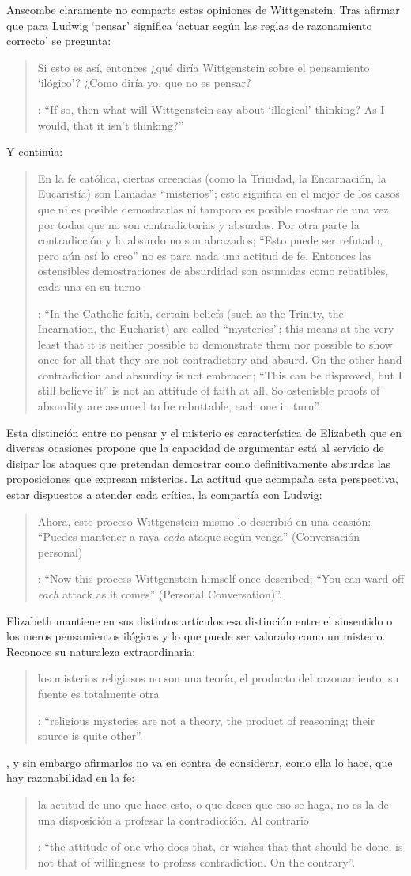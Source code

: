 Anscombe claramente no comparte estas opiniones de Wittgenstein. Tras afirmar que para Ludwig `pensar' significa \enquote*{actuar según las reglas de razonamiento correcto} se pregunta: \blockquote[{\Cite[122]{anscombe1981parmenides:qli}}: \enquote{If so, then what will Wittgenstein say about `illogical' thinking? As I would, that it isn't thinking?}]{Si esto es así, entonces ¿qué diría Wittgenstein sobre el pensamiento `ilógico'? ¿Como diría yo, que no es pensar?} Y continúa: \blockquote[{\Cite[122]{anscombe1981parmenides:qli}}: \enquote{In the Catholic faith, certain beliefs (such as the Trinity, the Incarnation, the Eucharist) are called ``mysteries''; this means at the very least that it is neither possible to demonstrate them nor possible to show once for all that they are not contradictory and absurd. On the other hand contradiction and absurdity is not embraced; ``This can be disproved, but I still believe it'' is not an attitude of faith at all. So ostenisble proofs of absurdity are assumed to be rebuttable, each one in turn}.]{En la fe católica, ciertas creencias (como la Trinidad, la Encarnación, la Eucaristía) son llamadas ``misterios''; esto significa en el mejor de los casos que ni es posible demostrarlas ni tampoco es posible mostrar de una vez por todas que no son contradictorias y absurdas. Por otra parte la contradicción y lo absurdo no son abrazados; ``Esto puede ser refutado, pero aún así lo creo'' no es para nada una actitud de fe. Entonces las ostensibles demostraciones de absurdidad son asumidas como rebatibles, cada una en su turno}. Esta distinción entre no pensar y el misterio es característica de Elizabeth que en diversas ocasiones propone que la capacidad de argumentar está al servicio de disipar los ataques que pretendan demostrar como definitivamente absurdas las proposiciones que expresan misterios. La actitud que acompaña esta perspectiva, estar dispuestos a atender cada crítica, la compartía con Ludwig: \blockquote[{\Cite[122]{anscombe1981parmenides:qli}}: \enquote{Now this process Wittgenstein himself once described: ``You can ward off \emph{each} attack as it comes'' (Personal Conversation)}.]{Ahora, este proceso Wittgenstein mismo lo describió en una ocasión: ``Puedes mantener a raya \emph{cada} ataque según venga'' (Conversación personal)}.

Elizabeth mantiene en sus distintos artículos esa distinción entre el sinsentido o los meros pensamientos ilógicos y lo que puede ser valorado como un misterio. Reconoce su naturaleza extraordinaria: \blockquote[{\Cite[122-123]{anscombe1981parmenides:qli}}: \enquote{religious mysteries are not a theory, the product of reasoning; their source is quite other}.]{los misterios religiosos no son una teoría, el producto del razonamiento; su fuente es totalmente otra}, y sin embargo afirmarlos no va en contra de considerar, como ella lo hace, que hay razonabilidad en la fe: \blockquote[{\Cite[122]{anscombe1981parmenides:qli}}: \enquote{the attitude of one who does that, or wishes that that should be done, is not that of willingness to profess contradiction. On the contrary}.]{la actitud de uno que hace esto, o que desea que eso se haga, no es la de una disposición a profesar la contradicción. Al contrario}.


